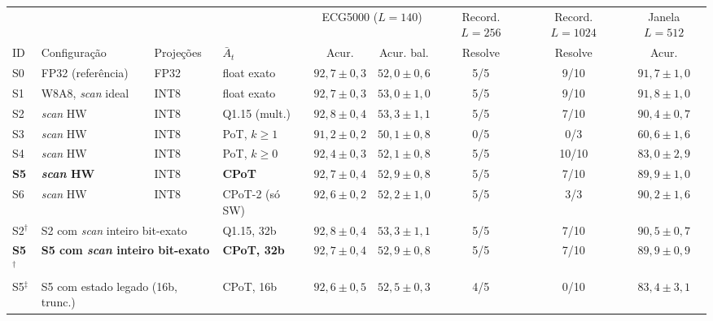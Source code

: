 \begin{tabular}{llllccccc}
\toprule
 & & & & \multicolumn{2}{c}{ECG5000 ($L=140$)} & Record. $L=256$ & Record. $L=1024$ & Janela $L=512$ \\
ID & Configuração & Projeções & $\bar{A}_t$ & Acur. & Acur. bal. & Resolve & Resolve & Acur. \\
\midrule
S0 & FP32 (referência) & FP32 & float exato & $92{,}7 \pm 0{,}3$ & $52{,}0 \pm 0{,}6$ & 5/5 & 9/10 & $91{,}7 \pm 1{,}0$ \\
S1 & W8A8, \emph{scan} ideal & INT8 & float exato & $92{,}7 \pm 0{,}3$ & $53{,}0 \pm 1{,}0$ & 5/5 & 9/10 & $91{,}8 \pm 1{,}0$ \\
S2 & \emph{scan} HW & INT8 & Q1.15 (mult.) & $92{,}8 \pm 0{,}4$ & $53{,}3 \pm 1{,}1$ & 5/5 & 7/10 & $90{,}4 \pm 0{,}7$ \\
S3 & \emph{scan} HW & INT8 & PoT, $k\geq1$ & $91{,}2 \pm 0{,}2$ & $50{,}1 \pm 0{,}8$ & 0/5 & 0/3 & $60{,}6 \pm 1{,}6$ \\
S4 & \emph{scan} HW & INT8 & PoT, $k\geq0$ & $92{,}4 \pm 0{,}3$ & $52{,}1 \pm 0{,}8$ & 5/5 & 10/10 & $83{,}0 \pm 2{,}9$ \\
\textbf{S5} & \textbf{\emph{scan} HW} & INT8 & \textbf{CPoT} & $92{,}7 \pm 0{,}4$ & $52{,}9 \pm 0{,}8$ & 5/5 & 7/10 & $89{,}9 \pm 1{,}0$ \\
S6 & \emph{scan} HW & INT8 & CPoT-2 (só SW) & $92{,}6 \pm 0{,}2$ & $52{,}2 \pm 1{,}0$ & 5/5 & 3/3 & $90{,}2 \pm 1{,}6$ \\
\midrule
S2$^\dagger$ & \multicolumn{2}{l}{S2 com \emph{scan} inteiro bit-exato} & Q1.15, 32b & $92{,}8 \pm 0{,}4$ & $53{,}3 \pm 1{,}1$ & 5/5 & 7/10 & $90{,}5 \pm 0{,}7$ \\
\textbf{S5$^\dagger$} & \multicolumn{2}{l}{\textbf{S5 com \emph{scan} inteiro bit-exato}} & \textbf{CPoT, 32b} & $92{,}7 \pm 0{,}4$ & $52{,}9 \pm 0{,}8$ & 5/5 & 7/10 & $89{,}9 \pm 0{,}9$ \\
S5$^\ddagger$ & \multicolumn{2}{l}{S5 com estado legado (16b, trunc.)} & CPoT, 16b & $92{,}6 \pm 0{,}5$ & $52{,}5 \pm 0{,}3$ & 4/5 & 0/10 & $83{,}4 \pm 3{,}1$ \\
\bottomrule
\end{tabular}
